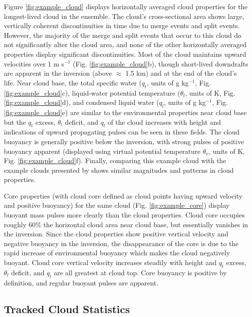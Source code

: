 \documentclass[acp]{copernicus}
\begin{document}
Figure \ref{fig:example_cloud} displays horizontally averaged cloud properties 
for the longest-lived cloud in the ensemble.  The cloud's cross-sectional area 
shows large, vertically coherent discontinuities in time due to merge events 
and split events.  However, the majority of the merge and split events that 
occur to this cloud do not significantly alter the cloud area, and none of the 
other horizontally averaged properties display significant discontinuities.  
Most of the cloud maintains upward velocities over 1 m s$^{-1}$ (Fig. 
\ref{fig:example_cloud}b), though short-lived downdrafts are apparent in the 
inversion (above $\approx$ 1.5 km) and at the end of the cloud's life.  Near 
cloud base, the total specific water ($q_t$, units of g kg$^{-1}$, Fig. 
\ref{fig:example_cloud}c), liquid-water potential temperature ($\theta_l$, 
units of K, Fig. \ref{fig:example_cloud}d), and condensed liquid water 
($q_l$, units of g kg$^{-1}$, Fig. \ref{fig:example_cloud}e) are similar to 
the environmental properties near cloud base but the $q_t$ excess, $\theta_l$ 
deficit, and $q_l$ of the cloud increases with height and indications of 
upward propagating pulses can be seen in these fields.  The cloud buoyancy is 
generally positive below the inversion, with strong pulses of positive buoyancy 
apparent (displayed using virtual potential temperature $\theta_v$, units of 
K, Fig. \ref{fig:example_cloud}f).  Finally, comparing this example cloud with 
the example clouds presented by \citet[][figs. 4 and 5]{Heus2009} shows 
similar magnitudes and patterns in cloud properties.

Core properties (with cloud core defined as cloud points having upward velocity
and positive buoyancy) for the same cloud (Fig. \ref{fig:example_core}) 
display buoyant mass pulses more clearly than the cloud properties.  Cloud core 
occupies roughly 60\% the horizontal cloud area near cloud base, but 
essentially vanishes in the inversion.  Since the cloud properties show 
positive vertical velocity and negative buoyancy in the inversion, the 
disappearance of the core is due to the rapid increase of environmental 
buoyancy which makes the cloud negatively buoyant.  Cloud core vertical 
velocity increases steadily with height and $q_t$ excess, $\theta_l$ deficit, 
and $q_l$ are all greatest at cloud top.  Core buoyancy is positive by 
definition, and regular buoyant pulses are apparent.

\subsection{Tracked Cloud Statistics}
\end{document}
